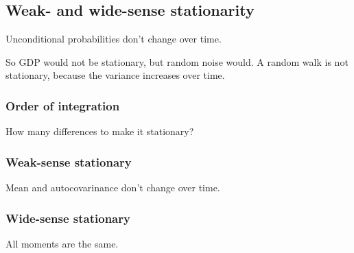
\subsection{Weak- and wide-sense stationarity}

Unconditional probabilities don't change over time.

So GDP would not be stationary, but random noise would. A random walk is not stationary, because the variance increases over time.

\subsubsection{Order of integration}

How many differences to make it stationary?

\subsubsection{Weak-sense stationary}

Mean and autocovarinance don't change over time.

\subsubsection{Wide-sense stationary}

All moments are the same.

